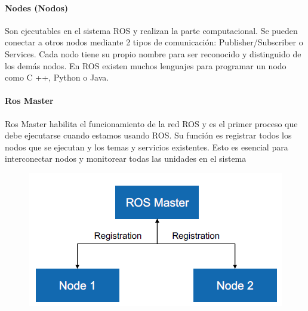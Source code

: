             \paragraph{Nodes (Nodos)}
                   Son ejecutables en el sistema ROS y realizan la parte computacional. Se pueden conectar a otros nodos mediante 2 tipos de comunicación: Publisher/Subscriber o Services. Cada nodo tiene su propio nombre para ser reconocido y distinguido de los demás nodos. En ROS existen muchos lenguajes para programar un nodo como C ++, Python o Java. 
                   
            \paragraph{Ros Master}
                    Ros Master habilita el funcionamiento de la red ROS y es el primer proceso que debe ejecutarse cuando estamos usando ROS. Su función es registrar todos los nodos que se ejecutan y los temas y servicios existentes. Esto es esencial para interconectar nodos y monitorear todas las unidades en el sistema
            \begin{figure}[htb]
                \centering
                \includegraphics[width=0.5\linewidth]{Main/Chapter3/Images3/n_s_a_6.png}
                \caption{}
                \label{f:Cap3_conceptos_6}
            \end{figure} 
            
            
               \newpage


